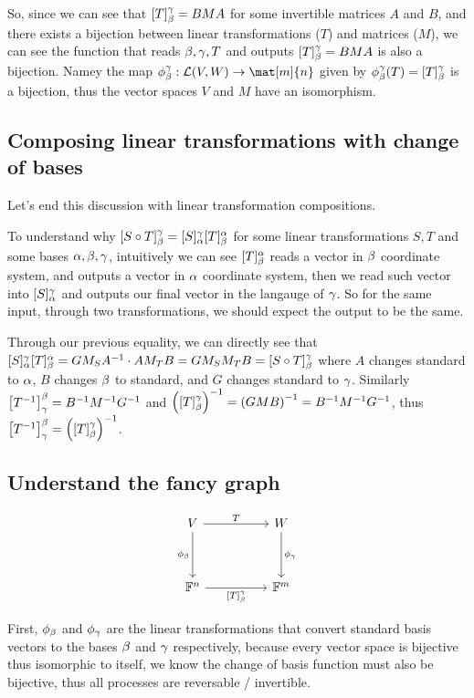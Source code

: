 \documentclass[11pt, cyan, night, 1in]{LatexTemplate/hw}
\begin{document}
So, since we can see that $[T]_\beta^\gamma=BMA$ for some invertible matrices $A$ and $B$, and there exists a bijection between linear transformations ($T$) and matrices ($M$), we can see the function that reads $\beta,\gamma, T$ and outputs $[T]_\beta^\gamma = BMA$ is also a bijection. Namey the map $\phi^\ga_\be: \cal{L}(V,W)\to \mat[m]{n}$ given by $\phi_\beta^\gamma(T)=[T]_\beta^\gamma$ is a bijection, thus the vector spaces $V$ and $M$ have an isomorphism. 

\subsection{Composing linear transformations with change of bases}

Let's end this discussion with linear transformation compositions.

To understand why $[S\circ T]_\beta^\gamma = [S]^\gamma_\alpha [T]_\beta^\alpha$ for some linear transformations $S,T$ and some bases $\alpha,\beta,\gamma$, intuitively we can see $[T]_\beta^\alpha$ reads a vector in $\beta$ coordinate system, and outputs a vector in $\alpha$ coordinate system, then we read such vector into $[S]^\gamma_\alpha$ and outputs our final vector in the langauge of $\gamma$. So for the same input, through  two transformations, we should expect the output to be the same.

Through our previous equality, we can directly see that $[S]^\gamma_\alpha [T]_\beta^\alpha = G M_S A^{-1} \cdot A M_T B = G M_S M_T B = [S\circ T]_\beta^\gamma$ where $A$ changes standard to $\alpha$, $B$ changes $\beta$ to standard, and $G$ changes standard to $\gamma$. Similarly $\left[T^{-1}\right]_\gamma^\beta= B^{-1} M^{-1} G^{-1}$ and $\left([T]_\beta^\gamma\right)^{-1}=\left(G M B\right)^{-1}=B^{-1} M^{-1} G^{-1}$, thus $\left[T^{-1}\right]_\gamma^\beta=\left([T]_\beta^\gamma\right)^{-1}$.

\subsection{Understand the fancy graph}

\[
    \begin{tikzcd}[row sep=huge, column sep=huge]
        V \arrow{r}{T} \arrow[swap]{d}{\phi_\be} & W \arrow{d}{\phi_\ga}\\
        \F^n \arrow[swap]{r}{[T]_\be^\ga} & \F^m
    \end{tikzcd}
\]

First, $\phi_\beta$ and $\phi_\gamma$ are the linear transformations that convert standard basis vectors to the bases $\beta$ and $\gamma$ respectively, because every vector space is bijective thus isomorphic to itself, we know the change of basis function must also be bijective, thus all processes are reversable / invertible.
\end{document}
